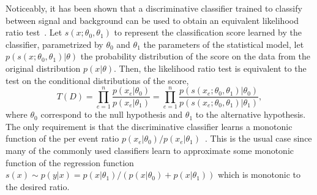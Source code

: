 \documentclass[a4paper]{jpconf}
\begin{document}
Noticeably, it has been shown that a discriminative classifier trained to classify between signal and background can be used to obtain an equivalent likelihood ratio test~\cite{Cranmer2015}. Let  $s(x;\theta_0, \theta_1)$ to represent the classification score learned by the classifier, parametrized by $\theta_0$ and $\theta_1$ the parameters of the statistical model, let $p( s({x; \theta_0, \theta_1}) | \theta )$ the probability distribution of the score on the data from the original distribution $p(x | \theta)$. Then, the likelihood ratio test is equivalent to the test on the conditional distributions of the score, 
\begin{equation}\label{eq:lrtest}
T(D) = \prod_{e=1}^n \frac{ p(x_e | \theta_0)}{ p(x_e | \theta_1)} = \prod_{e=1}^n \frac{ p(s(x_e; \theta_0, \theta_1) | \theta_0)}{ p(s(x_e; \theta_0, \theta_1) | \theta_1)},
\end{equation}
where $\theta_0$ correspond to the null hypothesis and $\theta_1$ to the alternative hypothesis. The only requirement is that the discriminative classifier learns a monotonic function of the per event ratio $p(x_e | \theta_0) / p(x_e | \theta_1)$~\cite{Cranmer2015}. This is the usual case since many of the commonly used classifiers learn to approximate some monotonic function of the regression function $s(x) \sim p(y|x) = p(x|\theta_1) / (p(x|\theta_0) + p(x|\theta_1))$ which is monotonic to the desired ratio. %
 
 
\end{document}

